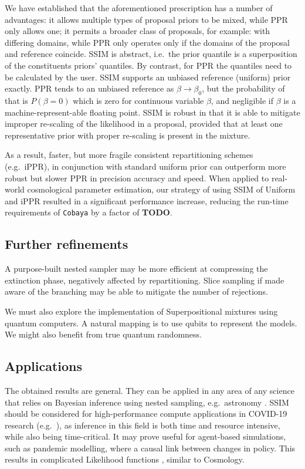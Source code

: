 \documentclass[usenatbib]{mnras}
\newcommand{\TODO}{\textbf{TODO}}
\begin{document}
We have established that the aforementioned prescription has a number
of advantages: it allows multiple types of proposal priors to be
mixed, while PPR only allows one; it permits a broader class of
proposals, for example: with differing domains, while PPR only
operates only if the domains of the proposal and reference coincide.
SSIM is abstract, i.e.~the prior quantile is a superposition of the
constituents priors' quantiles. By contrast, for PPR the quantiles
need to be calculated by the user. SSIM supports an unbiased reference
(uniform) prior exactly. PPR tends to an unbiased reference as
\(\beta\rightarrow\beta_{0}\), but the probability of that is
\(P(\beta=0)\) which is zero for continuous variable $\beta$, and
negligible if $\beta$ is a machine-represent-able floating point. SSIM
is robust in that it is able to mitigate improper re-scaling of the
likelihood in a proposal, provided that at least one representative
prior with proper re-scaling is present in the mixture.

As a result, faster, but more fragile consistent repartitioning
schemes (e.g.~iPPR), in conjunction with standard uniform prior can
outperform more robust but slower PPR in precision accuracy and speed.
When applied to real-world cosmological parameter estimation, our
strategy of using SSIM of Uniform and iPPR resulted in a significant
performance increase, reducing the run-time requirements of
\texttt{Cobaya} by a factor of \TODO.

\subsection{Further refinements}\label{sec:org8314ddf}

A purpose-built nested sampler may be more efficient at compressing
the extinction phase, negatively affected by repartitioning. Slice
sampling if made aware of the branching may be able to mitigate the
number of rejections. 

We must also explore the implementation of Superpositional mixtures
using quantum computers. A natural mapping is to use qubits to
represent the models. We might also benefit from true quantum
randomness.



\subsection{Applications}\label{sec:applications}
The obtained results are general. They can be applied in any area of
any science that relies on Bayesian inference using nested sampling,
e.g.~astronomy \citep{Casado_2016}. SSIM should be considered for
high-performance compute applications in COVID-19 research
(e.g.~\cite{Covid1,Covid2}), as inference in this field is both time
and resource intensive, while also being time-critical. It may prove
useful for agent-based simulations, such as pandemic modelling, where
a causal link between changes in policy. This results in complicated
Likelihood functions \citep{Covid2}, similar to Cosmology.
\end{document}
